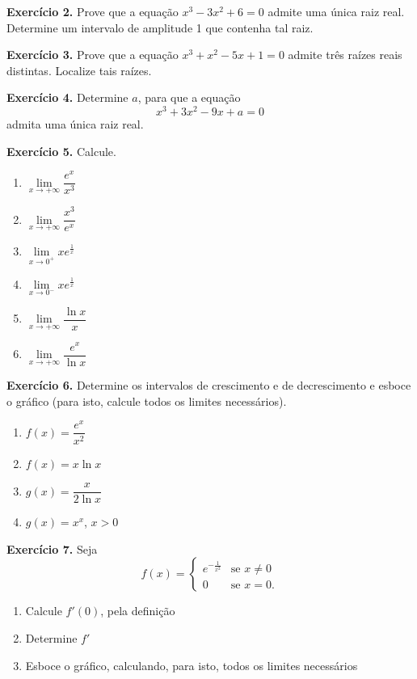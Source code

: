\documentclass[12pt,a4paper]{article}
\begin{document}
\vspace{0.5cm}
\noindent\textbf{Exercício 2.} Prove que a equação $x^3 - 3x^2 + 6 = 0$ admite uma única raiz real. Determine um intervalo de amplitude 1 que contenha tal raiz.

\vspace{0.5cm}
\noindent\textbf{Exercício 3.} Prove que a equação $x^3 + x^2 - 5x + 1 = 0$ admite três raízes reais distintas. Localize tais raízes.

\vspace{0.5cm}
\noindent\textbf{Exercício 4.} Determine $a$, para que a equação
\[
x^3 + 3x^2 - 9x + a = 0
\]
admita uma única raiz real.

\vspace{0.5cm}
\noindent\textbf{Exercício 5.} Calcule.
\begin{enumerate}
    \renewcommand{\theenumi}{\alph{enumi}}
    \renewcommand{\labelenumi}{\theenumi)}
    \item $\lim\limits_{x \to +\infty} \dfrac{e^x}{x^3}$
    \item $\lim\limits_{x \to +\infty} \dfrac{x^3}{e^x}$
    \item $\lim\limits_{x \to 0^+} x e^{\frac{1}{x}}$
    \item $\lim\limits_{x \to 0^-} x e^{\frac{1}{x}}$
    \item $\lim\limits_{x \to +\infty} \dfrac{\ln x}{x}$
    \item $\lim\limits_{x \to +\infty} \dfrac{e^x}{\ln x}$
\end{enumerate}

\vspace{0.5cm}
\noindent\textbf{Exercício 6.} Determine os intervalos de crescimento e de decrescimento e esboce o gráfico (para isto, calcule todos os limites necessários).
\begin{enumerate}
    \renewcommand{\theenumi}{\alph{enumi}}
    \renewcommand{\labelenumi}{\theenumi)}
    \item $f(x) = \dfrac{e^x}{x^2}$
    \item $f(x) = x \ln x$
    \item $g(x) = \dfrac{x}{2 \ln x}$
    \item $g(x) = x^x$, $x > 0$
\end{enumerate}

\vspace{0.5cm}
\noindent\textbf{Exercício 7.} Seja
\[
f(x) = \begin{cases}
e^{-\frac{1}{x^2}} & \text{se } x \neq 0 \\
0 & \text{se } x = 0.
\end{cases}
\]
\begin{enumerate}
    \renewcommand{\theenumi}{\alph{enumi}}
    \renewcommand{\labelenumi}{\theenumi)}
    \item Calcule $f'(0)$, pela definição
    \item Determine $f'$
    \item Esboce o gráfico, calculando, para isto, todos os limites necessários
\end{enumerate}
\end{document}
